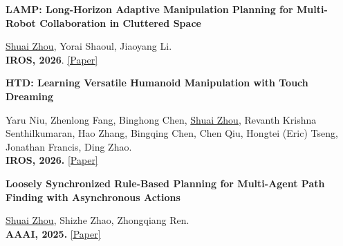 \documentclass[a4paper,9pt]{extarticle}
\newenvironment{publicationlist}[1]{%
    \renewcommand{\theenumi}{#1\arabic{enumi}}%
    \renewcommand{\labelenumi}{[\theenumi]}%
    \begin{etaremune}[leftmargin=2.8em,labelwidth=2.3em,labelsep=0.5em,
        itemsep=0pt,parsep=0pt]%
}{%
    \end{etaremune}%
}
\begin{document}
\begin{publicationlist}{C}
\item{}\label{pub:lamp} \textbf{LAMP: Long-Horizon Adaptive Manipulation Planning for Multi-Robot Collaboration in Cluttered Space}
\par\textup{\underline{Shuai Zhou}, Yorai Shaoul, Jiaoyang Li.  \\ \textbf{IROS, 2026}.  
\href{https://arxiv.org/abs/2606.29358}{[Paper]} }

\item{}\label{pub:htd} \textbf{HTD: Learning Versatile Humanoid Manipulation with Touch Dreaming}
\par\textup{Yaru Niu, Zhenlong Fang, Binghong Chen, \underline{Shuai Zhou}, Revanth Krishna Senthilkumaran, Hao Zhang, Bingqing Chen, Chen Qiu, Hongtei (Eric) Tseng, Jonathan Francis, Ding Zhao. \\ \textbf{IROS, 2026.} \href{https://arxiv.org/abs/2604.13015}{[Paper]}}
\item{}\label{pub:lsrp} \textbf{Loosely Synchronized Rule-Based Planning for Multi-Agent Path Finding with Asynchronous Actions}
\par\textup{\underline{Shuai Zhou}, Shizhe Zhao, Zhongqiang Ren. \\ \textbf{AAAI, 2025.} \href{https://doi.org/10.1609/aaai.v39i14.33618}{[Paper]} }
\end{publicationlist}
\vspace{-0.02in}
\vspace{-0.10in}
\end{document}
